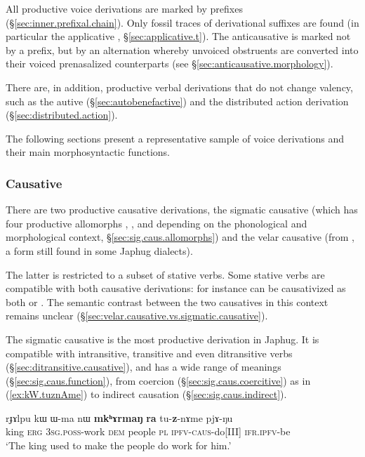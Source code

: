 All productive voice derivations are marked by prefixes (§\ref{sec:inner.prefixal.chain}). Only fossil traces of derivational suffixes are found (in particular the applicative , §\ref{sec:applicative.t}). The anticausative is marked not by a prefix, but by an alternation whereby unvoiced obstruents are converted into their voiced prenasalized counterparts (see §\ref{sec:anticausative.morphology}).

There are, in addition, productive verbal derivations that do not change valency, such as the autive  (§\ref{sec:autobenefactive}) and the distributed action derivation  (§\ref{sec:distributed.action}).

The following sections present a representative sample of voice derivations and their main morphosyntactic functions.

\subsubsection{Causative}
There are two productive causative derivations, the sigmatic causative (which has four productive allomorphs , ,  and  depending on the phonological and morphological context, §\ref{sec:sig.caus.allomorphs}) and the velar causative  (from , a form still found in some Japhug dialects).

The latter is restricted to a subset of stative verbs. Some stative verbs are compatible with both causative derivations: for instance  can be causativized as both  or . The semantic contrast between the two causatives in this context remains unclear (§\ref{sec:velar.causative.vs.sigmatic.causative}).

The sigmatic causative is the most productive derivation in Japhug. It is compatible with intransitive, transitive and even ditransitive verbs (§\ref{sec:ditransitive.causative}), and has a wide range of meanings (§\ref{sec:sig.caus.function}), from coercion (§\ref{sec:sig.caus.coercitive}) as in (\ref{ex:kW.tuznAme}) to indirect causation (§\ref{sec:sig.caus.indirect}).

\begin{exe}
\ex  \label{ex:kW.tuznAme}
\gll rɟɤlpu kɯ  ɯ-ma nɯ  \textbf{mkʰɤrmaŋ} \textbf{ra} tu-\textbf{z}-nɤme pjɤ-ŋu  \\
king \textsc{erg} \textsc{3sg}.\textsc{poss}-work \textsc{dem} people \textsc{pl}   \textsc{ipfv}-\textsc{caus}-do[III] \textsc{ifr}.\textsc{ipfv}-be \\
\glt `The king used to make the people do work for him.' 
\end{exe}

